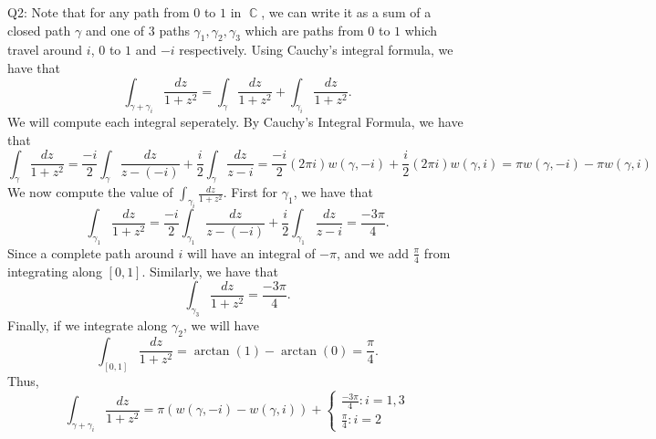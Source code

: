 \documentclass[letterpaper]{article}
\DeclareMathOperator{\C}{\mathbb{C}}
\begin{document}
\noindent Q2: Note that for any path from $0$ to $1$ in $\C$, we can write it as a sum of a closed path $\gamma$ and one of $3$ paths $\gamma_1,\gamma_2,\gamma_3$ which are paths from $0$ to $1$ which travel around $i$, $0$ to $1$ and $-i$ respectively. 
Using Cauchy's integral formula, we have that $$\int_{\gamma + \gamma_i} \frac{dz}{1+z^2} = \int_{\gamma} \frac{dz}{1+z^2} + \int_{\gamma_i} \frac{dz}{1+z^2} . $$ 
We will compute each integral seperately. By Cauchy's Integral Formula, we have that $$\int_{\gamma} \frac{dz}{1+z^2} = \frac{-i}{2} \int_\gamma \frac{dz}{z-(-i)} + \frac{i}{2} \int_{\gamma} \frac{dz}{z-i} = \frac{-i}{2}(2\pi i) w(\gamma , -i) + \frac{i}{2} (2\pi i) w(\gamma, i) = \pi w(\gamma, -i) - \pi w(\gamma, i)$$
We now compute the value of $\int_{\gamma_i} \frac{dz}{1+z^2}$. First for $\gamma_1$, we have that $$\int_{\gamma_1} \frac{dz}{1+z^2} =\frac{-i}{2} \int_{\gamma_1} \frac{dz}{z-(-i)} + \frac{i}{2} \int_{\gamma_1} \frac{dz}{z-i} = \frac{-3 \pi}{4}.$$
Since a complete path around $i$ will have an integral of $-\pi$, and we add $\frac{\pi}{4}$ from integrating along $[0,1]$. Similarly, we have that $$\int_{\gamma_3} \frac{dz}{1+z^2} = \frac{-3\pi}{4}. $$
Finally, if we integrate along $\gamma_2$, we will have $$\int_{[0,1]}\frac{dz}{1+z^2} = \arctan(1) - \arctan(0) = \frac{\pi}{4}. $$
Thus, $$\int_{\gamma+ \gamma_i} \frac{dz}{1+z^2} = \pi(w(\gamma, -i) - w(\gamma, i)) + \begin{cases} \frac{-3\pi}{4} : i=1,3 \\ \frac{\pi}{4} : i=2 \end{cases} $$
\end{document}
